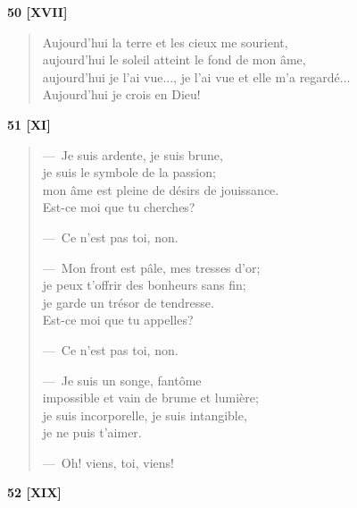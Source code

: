 
\begin{center}
  \textbf{50 [XVII]}
\end{center}

\begin{verse}
  Aujourd'hui la terre et les cieux me sourient, \\
  aujourd'hui le soleil atteint le fond de mon âme,\hspace*{-10pt} \\
  aujourd'hui je l'ai vue...,
  je l'ai vue et elle m'a regardé... \\
  Aujourd'hui je crois en Dieu!
\end{verse}


\begin{center}
  \textbf{51 [XI]}
\end{center}

\begin{verse}
  ---~Je suis ardente, je suis brune, \\
  je suis le symbole de la passion; \\
  mon âme est pleine de désirs de jouissance. \\
  Est-ce moi que tu cherches?

  ---~Ce n'est pas toi, non.

  ---~Mon front est pâle, mes tresses d'or; \\
  je peux t'offrir des bonheurs sans fin; \\
  je garde un trésor de tendresse. \\
  Est-ce moi que tu appelles?

  ---~Ce n'est pas toi, non.

  ---~Je suis un songe, fantôme \\
  impossible et vain de brume et lumière; \\
  je suis incorporelle, je suis intangible, \\
  je ne puis t'aimer.

  ---~Oh! viens, toi, viens!
\end{verse}


\begin{center}
  \textbf{52 [XIX]}
\end{center}

